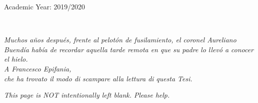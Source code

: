 \documentclass[12pt]{book}
\begin{document}
\vspace{2cm}
	
	\begin{center}
		Academic Year: 2019/2020
	\end{center}
	
	
\newpage 

\ 
\thispagestyle{empty}

\newpage
	
	
	\vspace*{5cm}
	\thispagestyle{empty}
	
	\begin{multicols}{2}
		\vspace*{\textheight}
		\columnbreak
		\begin{flushright}
			\slshape \onehalfspacing
			Muchos años después, frente al pelotón de fusilamiento, el coronel Aureliano Buendía había de recordar aquella tarde remota en que su padre lo llevó a conocer el hielo.
			\\ \vspace{2cm} A Francesco Epifania, \\ che ha trovato il modo di scampare alla lettura di questa Tesi.
		\end{flushright}
		
	\end{multicols}
	
	\begin{center}
	\emph{This page is NOT intentionally left blank. Please help.  }	
	\end{center}
	\
	
	\tableofcontents
	


%
%
\mainmatter
\thispagestyle{empty}
%	
%	
%    
%	
%	
%	
%	
	
	\appendix
	
	
\backmatter
	 
	
\end{document}
